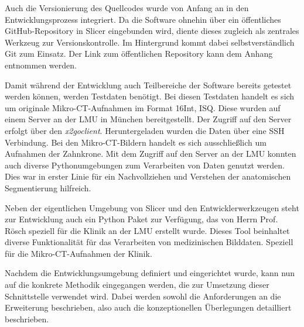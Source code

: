 Auch die Versionierung des Quellcodes wurde von Anfang an in den Entwicklungsprozess
integriert. Da die Software ohnehin über ein öffentliches GitHub-Repository in
Slicer eingebunden wird, diente dieses zugleich als zentrales Werkzeug zur Versionskontrolle.
Im Hintergrund kommt dabei selbstverständlich Git zum Einsatz. Der Link zum öffentlichen
Repository kann dem Anhang entnommen werden.

Damit während der Entwicklung auch Teilbereiche der Software bereits getestet werden
können, werden Testdaten benötigt. Bei diesen Testdaten handelt es sich um originale
Mikro-\ac{CT}-Aufnahmen im Format \ac{16Int}, \ac{ISQ}. Diese wurden auf einem
Server an der \ac{LMU} in München bereitgestellt. Der Zugriff auf den Server
erfolgt über den \textit{x2goclient}. Heruntergeladen wurden die Daten über eine
\ac{SSH} Verbindung. Bei den Mikro-\ac{CT}-Bildern handelt es sich ausschließlich
um Aufnahmen der Zahnkrone. Mit dem Zugriff auf den Server an der \ac{LMU} konnten
auch diverse Pythonumgebungen zum Verarbeiten von Daten genutzt werden. Dies war
in erster Linie für ein Nachvollziehen und Verstehen der anatomischen
Segmentierung hilfreich.

Neben der eigentlichen Umgebung von Slicer und den Entwicklerwerkzeugen steht
zur Entwicklung auch ein Python Paket zur Verfügung, das von Herrn Prof. Rösch
speziell für die Klinik an der \ac{LMU} erstellt wurde. Dieses Tool beinhaltet
diverse Funktionalität für das Verarbeiten von medizinischen Bilddaten. Speziell
für die Mikro-\ac{CT}-Aufnahmen der Klinik.

Nachdem die Entwicklungsumgebung definiert und eingerichtet wurde, kann nun auf die
konkrete Methodik eingegangen werden, die zur Umsetzung dieser Schnittstelle
verwendet wird. Dabei werden sowohl die Anforderungen an die Erweiterung beschrieben,
also auch die konzeptionellen Überlegungen detailliert beschrieben.

